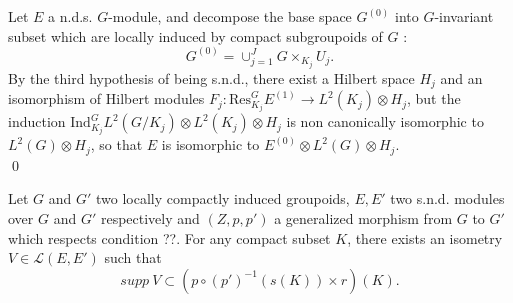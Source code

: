 \begin{dem}
Let $E$ a n.d.s. $G$-module, and decompose the base space $G^{(0)}$ into $G$-invariant subset which are locally induced by compact subgroupoids of $G$ :
\[G^{(0)} = \cup_{j=1}^J G\times_{K_j} U_j.\]
By the third hypothesis of being s.n.d., there exist a Hilbert space $H_j$ and an isomorphism of Hilbert modules $F_j :\text{Res}_{K_j}^G E^{(1)} \rightarrow  L^2(K_j)\otimes H_j$, but the induction $\text{Ind}_{K_j}^G L^2(G/K_j)\otimes L^2(K_j)\otimes H_j$ is non canonically isomorphic to $L^2(G)\otimes H_j$, so that $E$ is isomorphic to $E^{(0)}\otimes L^2(G)\otimes H_j$.\\
\qed
\end{dem}

\begin{cor}
Let $G$ and $G'$ two locally compactly induced groupoids, $E,E'$ two s.n.d. modules over $G$ and $G'$ respectively and $(Z,p,p')$ a generalized morphism from $G$ to $G'$ which respects condition ??. For any compact subset $K$, there exists an isometry $V\in \mathcal L(E,E')$ such that
\[supp\ V \subset (p\circ (p')^{-1}(s(K))\times r)(K). \]
\end{cor}
























 


